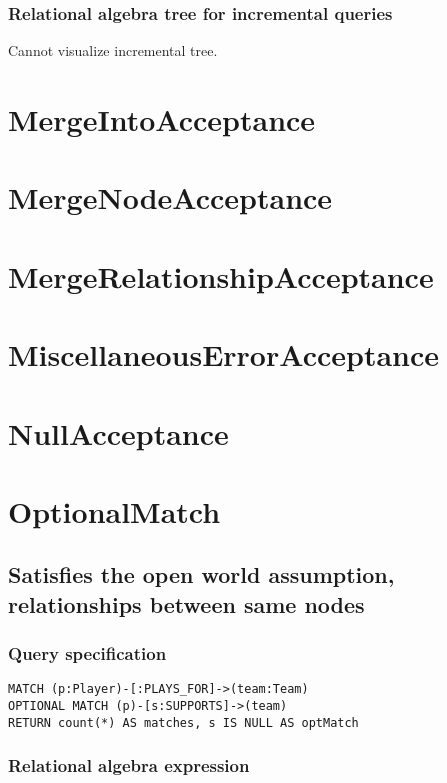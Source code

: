 
\subsubsection*{Relational algebra tree for incremental queries}

Cannot visualize incremental tree.
\section{MergeIntoAcceptance}

\section{MergeNodeAcceptance}

\section{MergeRelationshipAcceptance}

\section{MiscellaneousErrorAcceptance}

\section{NullAcceptance}

\section{OptionalMatch}


\subsection{Satisfies the open world assumption, relationships between same nodes}

\subsubsection*{Query specification}

\begin{lstlisting}
MATCH (p:Player)-[:PLAYS_FOR]->(team:Team)
OPTIONAL MATCH (p)-[s:SUPPORTS]->(team)
RETURN count(*) AS matches, s IS NULL AS optMatch
\end{lstlisting}

\subsubsection*{Relational algebra expression}

